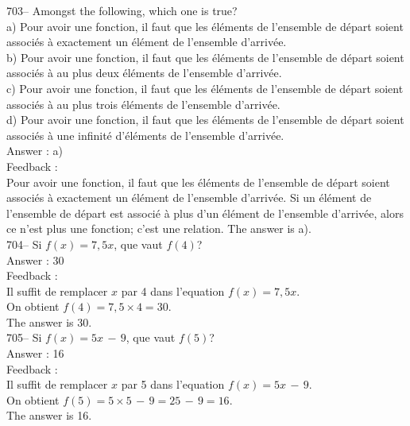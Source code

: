 ﻿\documentclass[letterpaper, 12pt]{article}
\begin{document}
703-- Amongst the following, which one is true?\\
a) Pour avoir une fonction, il faut que les \'el\'ements de
l'ensemble de d\'epart soient associ\'es \`a exactement un
\'el\'ement de l'ensemble
d'arriv\'ee.\\
b) Pour avoir une fonction, il faut que les \'el\'ements de l'ensemble de
d\'epart soient associ\'es \`a au plus deux \'el\'ements de l'ensemble
d'arriv\'ee.\\
c) Pour avoir une fonction, il faut que les \'el\'ements de l'ensemble de
d\'epart soient associ\'es \`a au plus trois \'el\'ements de l'ensemble
d'arriv\'ee.\\
d) Pour avoir une fonction, il faut que les \'el\'ements de l'ensemble de
d\'epart soient associ\'es \`a une infinit\'e d'\'el\'ements de l'ensemble
d'arriv\'ee.\\

Answer : a)\\

Feedback : \\
Pour avoir une fonction, il faut que les \'el\'ements de l'ensemble
de d\'epart soient associ\'es \`a exactement un \'el\'ement de
l'ensemble d'arriv\'ee.  Si un \'el\'ement de l'ensemble de d\'epart
est associ\'e \`a plus d'un \'el\'ement de l'ensemble d'arriv\'ee,
alors ce n'est plus une
fonction; c'est une relation.  The answer is a).\\

704-- Si $f(x)=7,5x$, que vaut $f(4)$?\\

Answer : 30\\

Feedback : \\
Il suffit de remplacer $x$ par 4 dans l'equation $f(x)=7,5x$.  \\
On obtient $f(4)=7,5\times4=30$.\\
The answer is 30.\\

705-- Si $f(x)=5x\,-\,9$, que vaut  $f(5)$?\\

Answer :  16\\

Feedback :  \\
Il suffit de remplacer $x$ par 5 dans l'equation $ f(x)=5x\,-\,9$.\\
On obtient $f(5)=5\times 5\,-\,9=25\,-\,9=16$.\\
The answer is 16.\\
\end{document}

